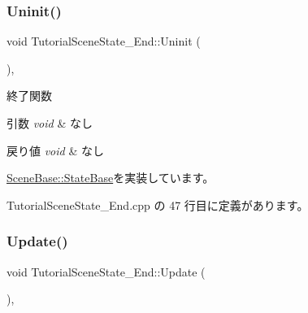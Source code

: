 \mbox{\label{class_tutorial_scene_state___end_aafc0d8d042de8c7f79d84fcdc35a807c}} 
\subsubsection{\texorpdfstring{Uninit()}{Uninit()}}
{\footnotesize\ttfamily void Tutorial\+Scene\+State\+\_\+\+End\+::\+Uninit (\begin{DoxyParamCaption}{ }\end{DoxyParamCaption})\hspace{0.3cm}{\ttfamily [override]}, {\ttfamily [virtual]}}



終了関数 


\begin{DoxyParams}{引数}
{\em void} & なし \\
\hline
\end{DoxyParams}

\begin{DoxyRetVals}{戻り値}
{\em void} & なし \\
\hline
\end{DoxyRetVals}


\mbox{\hyperlink{class_scene_base_1_1_state_base_a2763fa37e45b39bd8d3bbb735c76c59b}{Scene\+Base\+::\+State\+Base}}を実装しています。



 Tutorial\+Scene\+State\+\_\+\+End.\+cpp の 47 行目に定義があります。

\mbox{\label{class_tutorial_scene_state___end_a7cdf03fa9a0e41ab86c2b41b8165ad09}} 
\subsubsection{\texorpdfstring{Update()}{Update()}}
{\footnotesize\ttfamily void Tutorial\+Scene\+State\+\_\+\+End\+::\+Update (\begin{DoxyParamCaption}{ }\end{DoxyParamCaption})\hspace{0.3cm}{\ttfamily [override]}, {\ttfamily [virtual]}}



